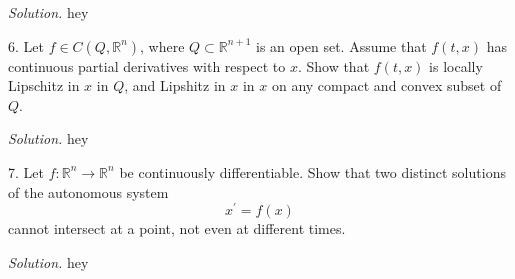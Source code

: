 \documentclass{article}
\newcommand{\R}{\mathbb{R}}
\begin{document}
\textit{Solution.}
hey

\newpage

6. Let $f \in C(Q, \R^n)$, where $Q \subset \R^{n + 1}$ is an open set. Assume
that $f(t, x)$ has continuous partial derivatives with respect to $x$. Show that
$f(t, x)$ is locally Lipschitz in $x$ in $Q$, and Lipshitz in $x$ in $x$ on any compact
and convex subset of $Q$.

\textit{Solution.}
hey

\newpage

7. Let $f: \R^n \to \R^n$ be continuously differentiable. Show that two distinct solutions
of the autonomous system
%
\begin{equation*}
    x^\prime = f(x)
\end{equation*}
%
cannot intersect at a point, not even at different times.

\textit{Solution.}
hey
\end{document}
